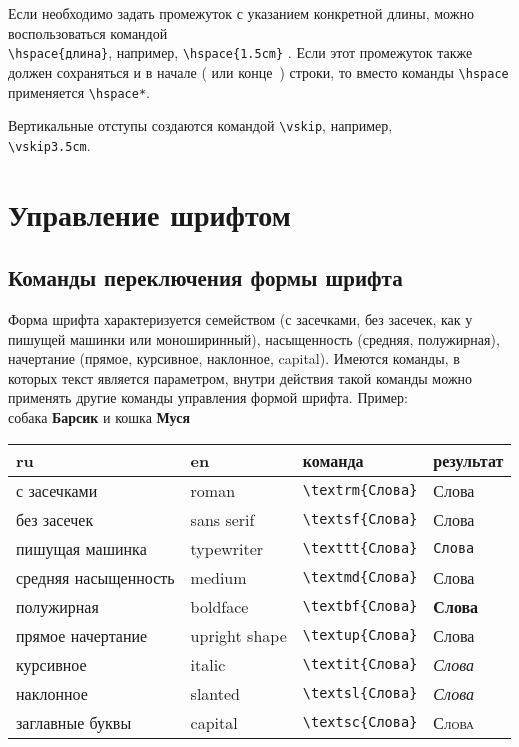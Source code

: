 Если необходимо задать промежуток с указанием конкретной длины, можно воспользоваться командой\\ 
\verb|\hspace{длина}|, например, \verb|\hspace{1.5cm}|  \cite[][с.~106]{__2003}. Если этот промежуток также должен сохраняться и в начале ( или конце~)  строки, то вместо команды \verb|\hspace| применяется \verb|\hspace*|.

Вертикальные отступы создаются командой \verb|\vskip|, например,\\ 
\verb|\vskip3.5cm|. 

\chapter{Управление шрифтом}\label{font}

\section{Команды переключения формы шрифта}

Форма шрифта характеризуется семейством (с засечками, без засечек, как у пишущей машинки или моноширинный), насыщенность (средняя, полужирная), начертание (прямое, курсивное, наклонное, capital). Имеются команды, в которых текст является параметром, внутри действия такой команды можно применять другие команды управления формой шрифта. Пример: \\
\textsf{собака \textbf{Барсик} и кошка \textbf{ Муся}}\\
\begin{minipage}{\textwidth}
\begin{tabular}{|l|l|l|l|}
\hline
ru&en&команда&результат\\
\hline
с засечками&roman&\verb|\textrm{Слова}|&\textrm{Слова}\\
без засечек&sans serif&\verb|\textsf{Слова}|&\textsf{Слова}\\
пишущая машинка&typewriter&\verb|\texttt{Слова}|&\texttt{Слова}\\
средняя насыщенность&medium&\verb|\textmd{Слова}|&\textmd{Слова}\\
полужирная&boldface&\verb|\textbf{Слова}|&\textbf{Слова}\\
прямое начертание&upright shape&\verb|\textup{Слова}|&\textup{Слова}\\
курсивное&italic&\verb|\textit{Слова}|&\textit{Слова}\\
наклонное&slanted&\verb|\textsl{Слова}|&\textsl{Слова}\\
заглавные буквы&capital&\verb|\textsc{Слова}|&\textsc{Слова}\\
\hline
\end{tabular}
\end{minipage}

